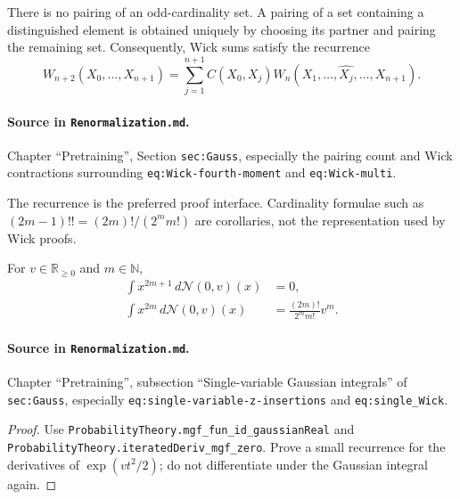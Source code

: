 \begin{lemma}
\label{lem:renorm:pairingAPI}
There is no pairing of an odd-cardinality set.  A pairing of a set containing a distinguished
element is obtained uniquely by choosing its partner and pairing the remaining set.  Consequently,
Wick sums satisfy the recurrence
\[
  W_{n+2}(X_0,\ldots,X_{n+1})
  =\sum_{j=1}^{n+1}C(X_0,X_j)
     W_n(X_1,\ldots,\widehat{X_j},\ldots,X_{n+1}).
\]

\paragraph{Source in \texttt{Renormalization.md}.}
Chapter ``Pretraining'', Section \texttt{sec:Gauss}, especially the pairing count and Wick
contractions surrounding \texttt{eq:Wick-fourth-moment} and \texttt{eq:Wick-multi}.
\end{lemma}

The recurrence is the preferred proof interface.  Cardinality formulae such as
$(2m-1)!!=(2m)!/(2^m m!)$ are corollaries, not the representation used by Wick proofs.

\begin{theorem}
\label{thm:renorm:scalarWick}
For $v\in\mathbb R_{\geq0}$ and $m\in\mathbb N$,
\begin{align*}
 \int x^{2m+1}\,d\mathcal N(0,v)(x)&=0,\\
 \int x^{2m}\,d\mathcal N(0,v)(x)&=\frac{(2m)!}{2^m m!}v^m.
\end{align*}

\paragraph{Source in \texttt{Renormalization.md}.}
Chapter ``Pretraining'', subsection ``Single-variable Gaussian integrals'' of
\texttt{sec:Gauss}, especially \texttt{eq:single-variable-z-insertions} and
\texttt{eq:single\_Wick}.
\end{theorem}

\begin{proof}
Use \texttt{ProbabilityTheory.mgf\_fun\_id\_gaussianReal} and
\texttt{ProbabilityTheory.iteratedDeriv\_mgf\_zero}.  Prove a small recurrence for the derivatives
of $\exp(vt^2/2)$; do not differentiate under the Gaussian integral again.
\end{proof}

